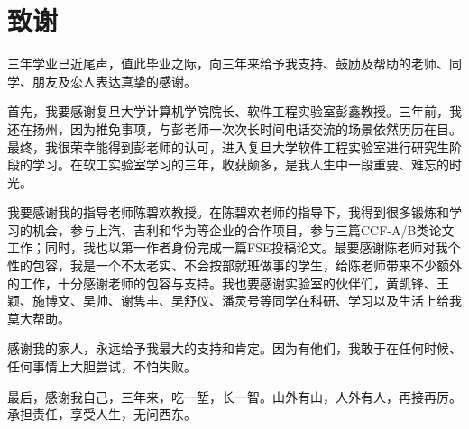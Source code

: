 \chapter{致谢}

三年学业已近尾声，值此毕业之际，向三年来给予我支持、鼓励及帮助的老师、同学、朋友及恋人表达真挚的感谢。

首先，我要感谢复旦大学计算机学院院长、软件工程实验室彭鑫教授。三年前，我还在扬州，因为推免事项，与彭老师一次次长时间电话交流的场景依然历历在目。最终，我很荣幸能得到彭老师的认可，进入复旦大学软件工程实验室进行研究生阶段的学习。在软工实验室学习的三年，收获颇多，是我人生中一段重要、难忘的时光。

我要感谢我的指导老师陈碧欢教授。在陈碧欢老师的指导下，我得到很多锻炼和学习的机会，参与上汽、吉利和华为等企业的合作项目，参与三篇CCF-A/B类论文工作；同时，我也以第一作者身份完成一篇FSE投稿论文。最要感谢陈老师对我个性的包容，我是一个不太老实、不会按部就班做事的学生，给陈老师带来不少额外的工作，十分感谢老师的包容与支持。我也要感谢实验室的伙伴们，黄凯锋、王颖、施博文、吴帅、谢隽丰、吴舒仪、潘灵号等同学在科研、学习以及生活上给我莫大帮助。

感谢我的家人，永远给予我最大的支持和肯定。因为有他们，我敢于在任何时候、任何事情上大胆尝试，不怕失败。

最后，感谢我自己，三年来，吃一堑，长一智。山外有山，人外有人，再接再厉。承担责任，享受人生，无问西东。